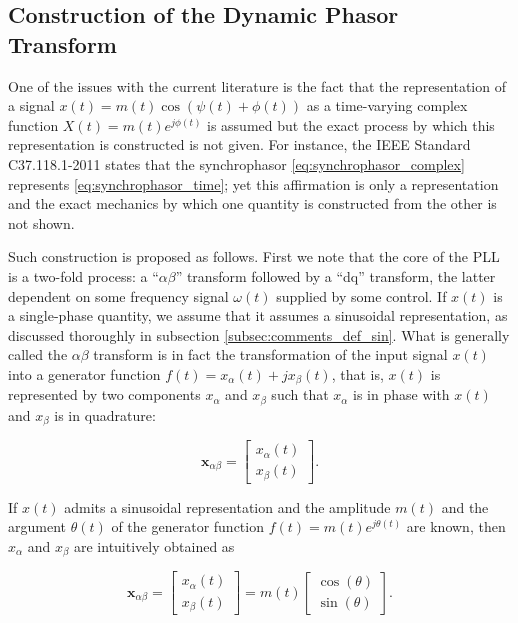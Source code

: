\subsection{Construction of the Dynamic Phasor Transform} %

	One of the issues with the current literature is the fact that the representation of a signal $x(t) = m(t)\cos\left(\psi(t) + \phi(t)\right)$ as a time-varying complex function $X(t) = m(t)e^{j\phi(t)}$ is assumed but the exact process by which this representation is constructed is not given. For instance, the IEEE Standard C37.118.1-2011 states that the synchrophasor \eqref{eq:synchrophasor_complex} represents \eqref{eq:synchrophasor_time}; yet this affirmation is only a representation and the exact mechanics by which one quantity is constructed from the other is not shown.

	 Such construction is proposed as follows. First we note that the core of the PLL is a two-fold process: a ``$\alpha\beta$'' transform followed by a ``dq'' transform, the latter dependent on some frequency signal $\omega(t)$ supplied by some control. If $x(t)$ is a single-phase quantity, we assume that it assumes a sinusoidal representation, as discussed thoroughly in subsection \ref{subsec:comments_def_sin}. What is generally called the $\alpha\beta$ transform is in fact the transformation of the input signal $x(t)$ into a generator function $f(t) = x_\alpha(t) + jx_\beta(t)$, that is, $x(t)$ is represented by two components $x_\alpha$ and $x_\beta$ such that $x_\alpha$ is in phase with $x(t)$ and $x_\beta$ is in quadrature:

\begin{equation} \mathbf{x}_{\alpha\beta} = \left[\begin{array}{c} x_\alpha(t) \\[3mm] x_\beta(t) \end{array}\right].\end{equation}

	If $x(t)$ admits a sinusoidal representation and the amplitude $m(t)$ and the argument $\theta(t)$ of the generator function $f(t) = m(t)e^{j\theta(t)}$ are known, then $x_\alpha$ and $x_\beta$ are intuitively obtained as

\begin{equation} \mathbf{x}_{\alpha\beta} = \left[\begin{array}{c} x_\alpha(t) \\[3mm] x_\beta(t) \end{array}\right] = m(t)\left[\begin{array}{c} \cos\left(\theta\right) \\[3mm] \sin\left(\theta\right) \end{array}\right] .\end{equation}

